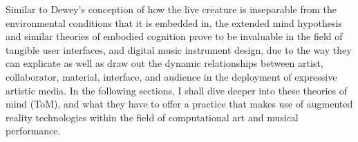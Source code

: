 Similar to Dewey’s conception of how the live creature is inseparable from the environmental conditions that it is embedded in, the extended mind hypothesis and similar theories of embodied cognition prove to be invaluable in the field of tangible user interfaces, and digital music instrument design, due to the way they can explicate as well as draw out the dynamic relationships between artist, collaborator, material, interface, and audience in the deployment of expressive artistic media. In the following sections, I shall dive deeper into these theories of mind (ToM), and what they have to offer a practice that makes use of augmented reality technologies within the field of computational art and musical performance.




